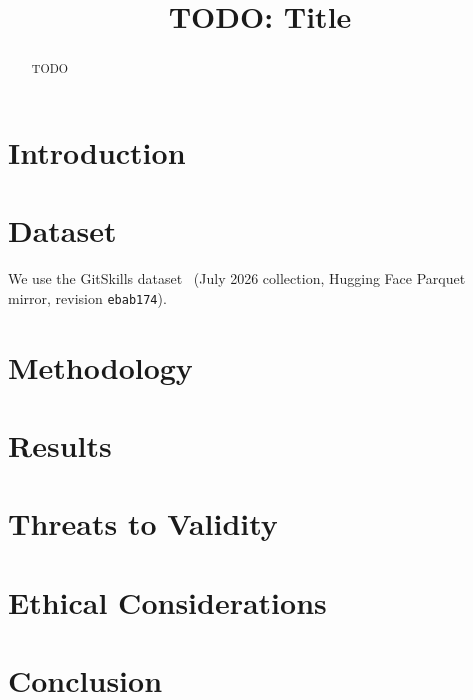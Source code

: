 \documentclass[10pt,conference]{IEEEtran}
\begin{document}
\title{TODO: Title}
\author{}
\maketitle

\begin{abstract}
TODO
\end{abstract}

\section{Introduction}

\section{Dataset}
We use the GitSkills dataset~\cite{gitskills} (July 2026 collection, Hugging Face Parquet mirror, revision \texttt{ebab174}).

\section{Methodology}

\section{Results}

\section{Threats to Validity}

\section{Ethical Considerations}

\section{Conclusion}



\end{document}
